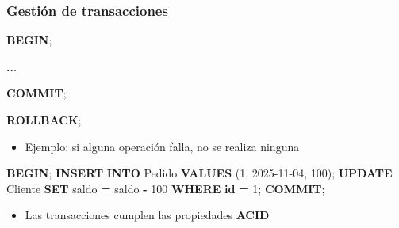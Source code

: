 \documentclass[
]{book}
\newenvironment{Shaded}{\begin{snugshade}}{\end{snugshade}}
\newcommand{\ControlFlowTok}[1]{\textcolor[rgb]{0.13,0.29,0.53}{\textbf{#1}}}
\newcommand{\DecValTok}[1]{\textcolor[rgb]{0.00,0.00,0.81}{#1}}
\newcommand{\KeywordTok}[1]{\textcolor[rgb]{0.13,0.29,0.53}{\textbf{#1}}}
\newcommand{\NormalTok}[1]{#1}
\newcommand{\OperatorTok}[1]{\textcolor[rgb]{0.81,0.36,0.00}{\textbf{#1}}}
\newcommand{\StringTok}[1]{\textcolor[rgb]{0.31,0.60,0.02}{#1}}
\providecommand{\tightlist}{%
  \setlength{\itemsep}{0pt}\setlength{\parskip}{0pt}}
\theoremstyle{break}
\theoremstyle{nonumberplain}
\begin{document}
\subsubsection{Gestión de transacciones}\label{gestiuxf3n-de-transacciones}

\begin{Shaded}
\begin{Highlighting}[]
\ControlFlowTok{BEGIN}\NormalTok{;}

  \OperatorTok{..}\NormalTok{.}
  
\KeywordTok{COMMIT}\NormalTok{;}

\KeywordTok{ROLLBACK}\NormalTok{;}
\end{Highlighting}
\end{Shaded}

\begin{itemize}
\tightlist
\item
  Ejemplo: si alguna operación falla, no se realiza ninguna
\end{itemize}

\begin{Shaded}
\begin{Highlighting}[]
\ControlFlowTok{BEGIN}\NormalTok{;}
  \KeywordTok{INSERT} \KeywordTok{INTO}\NormalTok{ Pedido }\KeywordTok{VALUES}\NormalTok{ (}\DecValTok{1}\NormalTok{, }\StringTok{\textquotesingle{}2025{-}11{-}04\textquotesingle{}}\NormalTok{, }\DecValTok{100}\NormalTok{);}
  \KeywordTok{UPDATE}\NormalTok{ Cliente }\KeywordTok{SET}\NormalTok{ saldo }\OperatorTok{=}\NormalTok{ saldo }\OperatorTok{{-}} \DecValTok{100} \KeywordTok{WHERE} \KeywordTok{id} \OperatorTok{=} \DecValTok{1}\NormalTok{;}
\KeywordTok{COMMIT}\NormalTok{;}
\end{Highlighting}
\end{Shaded}

\begin{itemize}
\tightlist
\item
  Las transacciones cumplen las propiedades \textbf{ACID}
\end{itemize}
\end{document}
